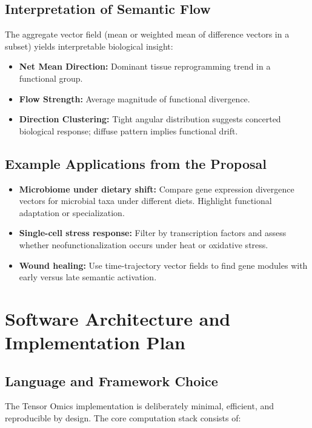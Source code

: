 \documentclass[11pt]{article}
\begin{document}
\subsection{Interpretation of Semantic Flow}

The aggregate vector field (mean or weighted mean of difference vectors in a subset) yields interpretable biological insight:
\begin{itemize}[leftmargin=1.5em]
    \item \textbf{Net Mean Direction:} Dominant tissue reprogramming trend in a functional group.
    \item \textbf{Flow Strength:} Average magnitude of functional divergence.
    \item \textbf{Direction Clustering:} Tight angular distribution suggests concerted biological response; diffuse pattern implies functional drift.
\end{itemize}

\subsection{Example Applications from the Proposal}

\begin{itemize}[leftmargin=1.5em]
    \item \textbf{Microbiome under dietary shift:} Compare gene expression divergence vectors for microbial taxa under different diets. Highlight functional adaptation or specialization.
    \item \textbf{Single-cell stress response:} Filter by transcription factors and assess whether neofunctionalization occurs under heat or oxidative stress.
    \item \textbf{Wound healing:} Use time-trajectory vector fields to find gene modules with early versus late semantic activation.
\end{itemize}

\section{Software Architecture and Implementation Plan}

\subsection{Language and Framework Choice}

The Tensor Omics implementation is deliberately minimal, efficient, and reproducible by design. The core computation stack consists of:
\end{document}
